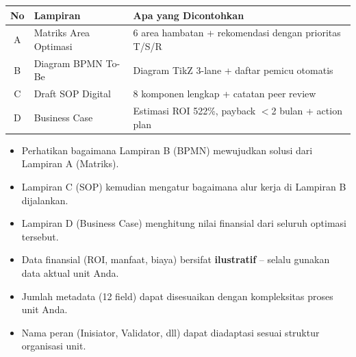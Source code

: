 \documentclass[12pt,a4paper]{report}
\begin{document}
\vspace{0.3cm}


\vspace{0.2cm}

{\small
\renewcommand{\arraystretch}{1.6}
\begin{tabularx}{\textwidth}{@{} c p{3.5cm} X @{}}
\toprule
\textbf{No} & \textbf{Lampiran} & \textbf{Apa yang Dicontohkan} \\
\midrule
A & Matriks Area Optimasi & 6 area hambatan + rekomendasi dengan prioritas T/S/R \\
B & Diagram BPMN To-Be & Diagram TikZ 3-lane + daftar pemicu otomatis \\
C & Draft SOP Digital & 8 komponen lengkap + catatan peer review \\
D & Business Case & Estimasi ROI 522\%, payback $<$2 bulan + action plan \\
\bottomrule
\end{tabularx}
\renewcommand{\arraystretch}{1.0}
}

\vspace{0.3cm}

\begin{tipbox}
\begin{itemize}
    \item Perhatikan bagaimana Lampiran B (BPMN) mewujudkan solusi dari Lampiran A (Matriks).
    \item Lampiran C (SOP) kemudian mengatur bagaimana alur kerja di Lampiran B dijalankan.
    \item Lampiran D (Business Case) menghitung nilai finansial dari seluruh optimasi tersebut.
\end{itemize}
\end{tipbox}

\vspace{0.3cm}

\begin{warnbox}
\begin{itemize}
    \item Data finansial (ROI, manfaat, biaya) bersifat \textbf{ilustratif} -- selalu gunakan data aktual unit Anda.
    \item Jumlah metadata (12 field) dapat disesuaikan dengan kompleksitas proses unit Anda.
    \item Nama peran (Inisiator, Validator, dll) dapat diadaptasi sesuai struktur organisasi unit.
\end{itemize}
\end{warnbox}
\end{document}
